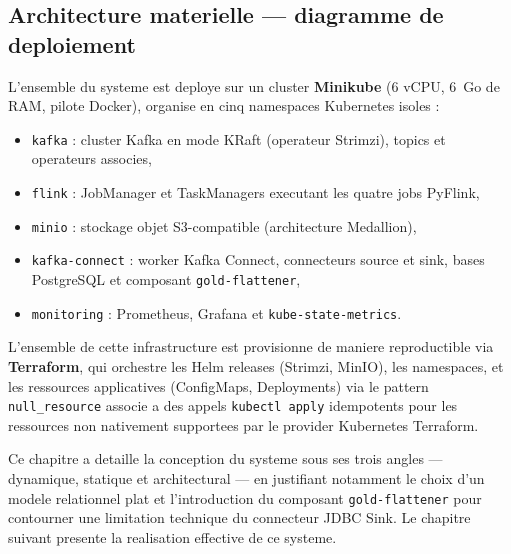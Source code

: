 \subsection{Architecture materielle --- diagramme de deploiement}

L'ensemble du systeme est deploye sur un cluster \textbf{Minikube} (6 vCPU, 6~Go de
RAM, pilote Docker), organise en cinq namespaces Kubernetes isoles :

\begin{itemize}
    \item \texttt{kafka} : cluster Kafka en mode KRaft (operateur Strimzi), topics et
    operateurs associes,
    \item \texttt{flink} : JobManager et TaskManagers executant les quatre jobs
    PyFlink,
    \item \texttt{minio} : stockage objet S3-compatible (architecture Medallion),
    \item \texttt{kafka-connect} : worker Kafka Connect, connecteurs source et sink,
    bases PostgreSQL et composant \texttt{gold-flattener},
    \item \texttt{monitoring} : Prometheus, Grafana et \texttt{kube-state-metrics}.
\end{itemize}

L'ensemble de cette infrastructure est provisionne de maniere reproductible via
\textbf{Terraform}, qui orchestre les Helm releases (Strimzi, MinIO), les namespaces,
et les ressources applicatives (ConfigMaps, Deployments) via le pattern
\texttt{null\_resource} associe a des appels \texttt{kubectl apply} idempotents pour
les ressources non nativement supportees par le provider Kubernetes Terraform.

\conclusionchapitre

Ce chapitre a detaille la conception du systeme sous ses trois angles --- dynamique,
statique et architectural --- en justifiant notamment le choix d'un modele
relationnel plat et l'introduction du composant \texttt{gold-flattener} pour
contourner une limitation technique du connecteur JDBC Sink. Le chapitre suivant
presente la realisation effective de ce systeme.
